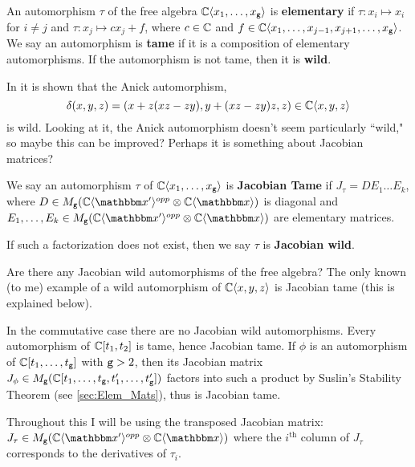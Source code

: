 An automorphism $\tau$ of the free algebra $\mathbb{C}\langle x_1,\dots, x_{\texttt{g}} \rangle$ is {\bf elementary} if $\tau:x_i \mapsto x_i$ 
	for $i\neq j$ and $\tau:x_j \mapsto cx_j + f$, where $c\in \mathbb{C}$ and $f\in \mathbb{C}\langle x_1,\dots, x_{j-1}, x_{j+1},\dots, x_{\texttt{g}} \rangle$.
We say an automorphism is {\bf tame} if it is a composition of elementary automorphisms.
If the automorphism is not tame, then it is {\bf wild}.

In \cite{U07} it is shown that the Anick automorphism, 
\[
	\delta(x,y,z) = (x + z(xz - zy), y + (xz - zy)z, z)\in \mathbb{C}\langle x,y,z \rangle
\]
is wild.
Looking at it, the Anick automorphism doesn't seem particularly ``wild," so maybe this can be improved?
Perhaps it is something about Jacobian matrices?

\begin{definition}
	We say an automorphism $\tau$ of $\mathbb{C}\langle x_1,\dots, x_{\texttt{g}} \rangle$ is \textbf{Jacobian Tame} if
	$J_\tau = DE_1\dots E_k$, where $D\in M_\ttg(\C\fralg{\bbx'}^{opp}\otimes \C\fralg{\bbx})$ is diagonal and
	$E_1,\dots, E_k\in M_\ttg(\C\fralg{\bbx'}^{opp}\otimes \C\fralg{\bbx})$ are elementary matrices.
	
	If such a factorization does not exist, then we say $\tau$ is \textbf{Jacobian wild}.
\end{definition}


\begin{problem}
	Are there any Jacobian wild automorphisms of the free algebra?
	The only known (to me) example of a wild automorphism of $\mathbb{C}\langle x,y,z \rangle$ is Jacobian tame (this is explained below).
	
	In the commutative case there are no Jacobian wild automorphisms.
	Every automorphism of $\mathbb{C}[t_1,t_2]$ is tame, hence Jacobian tame.
	If $\phi$ is an automorphism of $\mathbb{C}[t_1,\dots, t_{\texttt{g}}]$ with ${\texttt{g}}>2$, then its Jacobian matrix
	$J_\phi\in M_{\texttt{g}}(\mathbb{C}[t_1,\dots, t_{\texttt{g}},t_1',\dots,t_{\texttt{g}}'])$ factors into such a product by Suslin's Stability Theorem (see \ref{sec:Elem_Mats}), thus is Jacobian tame.
\end{problem}

Throughout this I will be using the transposed Jacobian matrix: $J_\tau \in M_\ttg(\C\fralg{\bbx'}^{opp}\otimes \C\fralg{\bbx})$ where the 	
	$i^\text{th}$ column of $J_\tau$ corresponds to the derivatives of $\tau_i$.

